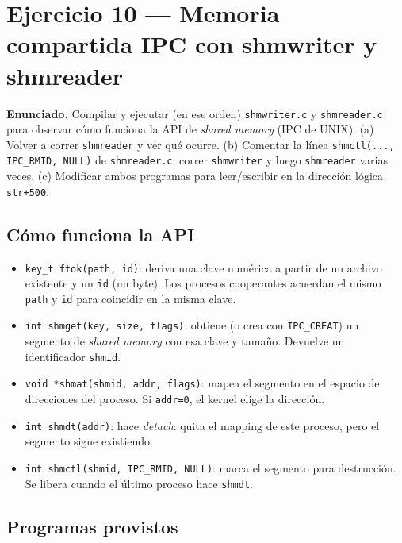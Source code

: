 \documentclass[11pt,a4paper]{article}
\begin{document}
\section{Ejercicio 10 --- Memoria compartida IPC con shmwriter y shmreader}

\textbf{Enunciado.} Compilar y ejecutar (en ese orden)
\texttt{shmwriter.c} y \texttt{shmreader.c} para observar cómo
funciona la API de \emph{shared memory} (IPC de UNIX). (a) Volver a
correr \texttt{shmreader} y ver qué ocurre. (b) Comentar la línea
\texttt{shmctl(..., IPC\_RMID, NULL)} de \texttt{shmreader.c}; correr
\texttt{shmwriter} y luego \texttt{shmreader} varias veces.
(c) Modificar ambos programas para leer/escribir en la dirección
lógica \texttt{str+500}.

\subsection{Cómo funciona la API}

\begin{itemize}[leftmargin=*]
    \item \verb|key_t ftok(path, id)|: deriva una clave numérica a
        partir de un archivo existente y un \texttt{id} (un byte). Los
        procesos cooperantes acuerdan el mismo \texttt{path} y
        \texttt{id} para coincidir en la misma clave.
    \item \verb|int shmget(key, size, flags)|: obtiene (o crea con
        \texttt{IPC\_CREAT}) un segmento de \emph{shared memory} con
        esa clave y tamaño. Devuelve un identificador \texttt{shmid}.
    \item \verb|void *shmat(shmid, addr, flags)|: mapea el segmento
        en el espacio de direcciones del proceso. Si \texttt{addr=0},
        el kernel elige la dirección.
    \item \verb|int shmdt(addr)|: hace \emph{detach}: quita el mapping
        de este proceso, pero el segmento sigue existiendo.
    \item \verb|int shmctl(shmid, IPC_RMID, NULL)|: marca el segmento
        para destrucción. Se libera cuando el último proceso hace
        \texttt{shmdt}.
\end{itemize}

\subsection{Programas provistos}
\end{document}
